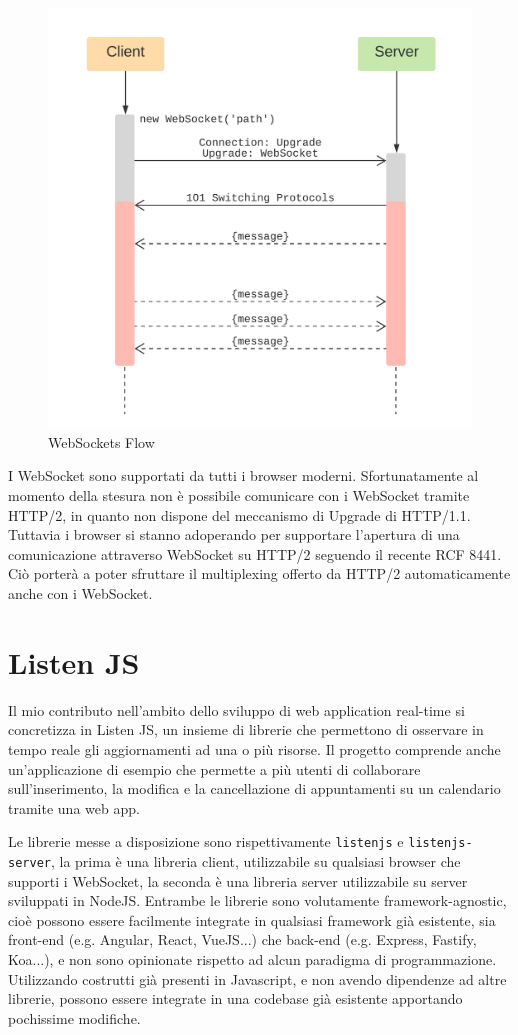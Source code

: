 \documentclass[12pt,a4paper,openright]{report}
\begin{document}
\begin{figure}[!htbp]
\centering
\includegraphics[width=.5\textwidth]{assets/websockets.png}
\caption{WebSockets Flow}
\label{fig:websockets}
\end{figure}
I WebSocket sono supportati da tutti i browser moderni. 
Sfortunatamente al momento della stesura non è possibile comunicare con i WebSocket tramite HTTP/2, in quanto non dispone del meccanismo di Upgrade di HTTP/1.1. Tuttavia i browser si stanno adoperando per supportare l'apertura di una comunicazione attraverso WebSocket su HTTP/2 seguendo il recente RCF 8441\cite{websockets_http2_rfc}. Ciò porterà a poter sfruttare il multiplexing offerto da HTTP/2 automaticamente anche con i WebSocket.
\chapter{Listen JS}
Il mio contributo nell'ambito dello sviluppo di web application real-time si concretizza in Listen JS, un insieme di librerie che permettono di osservare in tempo reale gli aggiornamenti ad una o più risorse.
Il progetto comprende anche un'applicazione di esempio che permette a più utenti di collaborare sull'inserimento, la modifica e la cancellazione di appuntamenti su un calendario tramite una web app.

\bigskip

Le librerie messe a disposizione sono rispettivamente \lstinline{listenjs} e \lstinline{listenjs-server}, la prima è una libreria client, utilizzabile su qualsiasi browser che supporti i WebSocket, la seconda è una libreria server utilizzabile su server sviluppati in NodeJS.
Entrambe le librerie sono volutamente framework-agnostic, cioè possono essere facilmente integrate in qualsiasi framework già esistente, sia front-end (e.g. Angular, React, VueJS...) che back-end (e.g. Express, Fastify, Koa...), e non sono opinionate rispetto ad alcun paradigma di programmazione. Utilizzando costrutti già presenti in Javascript, e non avendo dipendenze ad altre librerie, possono essere integrate in una codebase già esistente apportando pochissime modifiche.
\end{document}
